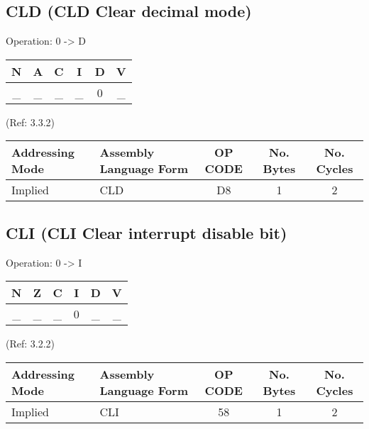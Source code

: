 \documentclass{article}
\begin{document}
  \subsection{CLD (CLD Clear decimal mode)}

  Operation:  0 -> D
  \begin{table}[H]
  \centering
  \begin{tabular}{|c c c c c c|}
  \hline
  N&A&C&I&D&V\\
  \hline
  \_ & \_ & \_ & \_ & 0 & \_\\
  \hline
  \end{tabular}
  \end{table}
                                (Ref: 3.3.2)
  \begin{table}[H]
  \centering
  \begin{tabular}{|l|l|c|c|c|}
  \hline
   Addressing Mode& Assembly Language Form& OP CODE &No. Bytes&No. Cycles\\
  \hline
    Implied       &   CLD                 &    D8   &    1    &    2\\
  \hline
  \end{tabular}
  \end{table}


  \subsection{CLI (CLI Clear interrupt disable bit)}

  Operation: 0 -> I
  \begin{table}[H]
  \centering
  \begin{tabular}{|c c c c c c|}
  \hline
  N&Z&C&I&D&V\\
  \hline
  \_ & \_ & \_ & 0 & \_ & \_\\
  \hline
  \end{tabular}
  \end{table}
                                (Ref: 3.2.2)
  \begin{table}[H]
  \centering
  \begin{tabular}{|l|l|c|c|c|}
  \hline
   Addressing Mode& Assembly Language Form& OP CODE &No. Bytes&No. Cycles\\
  \hline
    Implied       &   CLI                 &    58   &    1    &    2\\
  \hline
  \end{tabular}
  \end{table}

  
\end{document}

